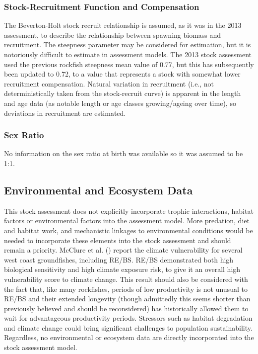 \documentclass[
]{scrartcl}
\begin{document}
\subsubsection{Stock-Recruitment Function and
Compensation}\label{stock-recruitment-function-and-compensation}

The Beverton-Holt stock recruit relationship is assumed, as it was in
the 2013 assessment, to describe the relationship between spawning
biomass and recruitment. The steepness parameter may be considered for
estimation, but it is notoriously difficult to estimate in assessment
models. The 2013 stock assessment used the previous rockfish steepness
mean value of 0.77, but this has subsequently been updated to 0.72, to a
value that represents a stock with somewhat lower recruitment
compensation. Natural variation in recruitment (i.e., not
deterministically taken from the stock-recruit curve) is apparent in the
length and age data (as notable length or age classes growing/ageing
over time), so deviations in recruitment are estimated.

\subsubsection{Sex Ratio}\label{sex-ratio}

No information on the sex ratio at birth was available so it was assumed
to be 1:1.

\subsection{Environmental and Ecosystem
Data}\label{environmental-and-ecosystem-data}

This stock assessment does not explicitly incorporate trophic
interactions, habitat factors or environmental factors into the
assessment model. More predation, diet and habitat work, and mechanistic
linkages to environmental conditions would be needed to incorporate
these elements into the stock assessment and should remain a priority.
McClure et al. () report the climate
vulnerability for several west coast groundfishes, including RE/BS.
RE/BS demonstrated both high biological sensitivity and high climate
exposure risk, to give it an overall high vulnerability score to climate
change. This result should also be considered with the fact that, like
many rockfishes, periods of low productivity is not unusual to RE/BS and
their extended longevity (though admittedly this seems shorter than
previously believed and should be reconsidered) has historically allowed
them to wait for advantageous productivity periods. Stressors such as
habitat degradation and climate change could bring significant
challenges to population sustainability. Regardless, no environmental or
ecosystem data are directly incorporated into the stock assessment
model.
\end{document}
